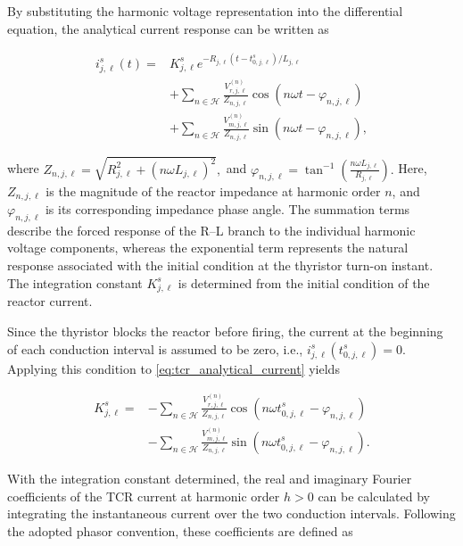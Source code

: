 \documentclass[journal]{IEEEtran}
\begin{document}
By substituting the harmonic voltage representation into the
differential equation, the analytical current response can be written as

\begin{equation}
\begin{aligned}
    i_{j,\ell}^{s}(t)=&K_{j,\ell}^{s}
    e^{-R_{j,\ell}(t-t_{0,j,\ell}^{s})/L_{j,\ell}}\\
    &+\sum_{n\in\mathcal{H}}
    \frac{V_{r,j,\ell}^{(n)}}{Z_{n,j,\ell}}
    \cos(n\omega t-\varphi_{n,j,\ell})\\
    &+\sum_{n\in\mathcal{H}}
    \frac{V_{m,j,\ell}^{(n)}}{Z_{n,j,\ell}}
    \sin(n\omega t-\varphi_{n,j,\ell}),
\end{aligned}
\label{eq:tcr_analytical_current}
\end{equation}

\noindent where $Z_{n,j,\ell}=
    \sqrt{R_{j,\ell}^{2}+(n\omega L_{j,\ell})^{2}},$ and $\varphi_{n,j,\ell}=
    \tan^{-1}\left(\frac{n\omega L_{j,\ell}}{R_{j,\ell}}\right).$ Here, $Z_{n,j,\ell}$ is the magnitude of the reactor impedance at
harmonic order $n$, and $\varphi_{n,j,\ell}$ is its corresponding
impedance phase angle. The summation terms describe the forced response
of the R--L branch to the individual harmonic voltage components,
whereas the exponential term represents the natural response associated
with the initial condition at the thyristor turn-on instant.
The integration constant $K_{j,\ell}^{s}$ is determined from the
initial condition of the reactor current.

Since the thyristor blocks the reactor before firing, the current at the
beginning of each conduction interval is assumed to be zero, i.e.,
$i_{j,\ell}^{s}(t_{0,j,\ell}^{s})=0$. Applying this condition to
\eqref{eq:tcr_analytical_current} yields

\begin{equation}
\begin{aligned}
    K_{j,\ell}^{s}=&-
    \sum_{n\in\mathcal{H}}
    \frac{V_{r,j,\ell}^{(n)}}{Z_{n,j,\ell}}
    \cos(n\omega t_{0,j,\ell}^{s}-\varphi_{n,j,\ell})\\
    &-
    \sum_{n\in\mathcal{H}}
    \frac{V_{m,j,\ell}^{(n)}}{Z_{n,j,\ell}}
    \sin(n\omega t_{0,j,\ell}^{s}-\varphi_{n,j,\ell}).
\end{aligned}
\label{eq:tcr_initial_constant}
\end{equation}

With the integration constant determined, the real and imaginary
Fourier coefficients of the TCR current at harmonic order $h>0$
can be calculated by integrating the instantaneous current over
the two conduction intervals. Following the adopted phasor convention,
these coefficients are defined as
\end{document}
